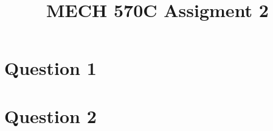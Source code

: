 \documentclass[a4paper,12pt]{article} %
\begin{document}
\setlength{\parskip}{1em} 
\setlength{\parindent}{0pt}
\newcommand{\vect}[1]{\mathbf{#1}}

\title{MECH 570C Assigment 2}

\section{\textbf{Question 1}}



\newpage

\section{\textbf{Question 2}}
\end{document}
